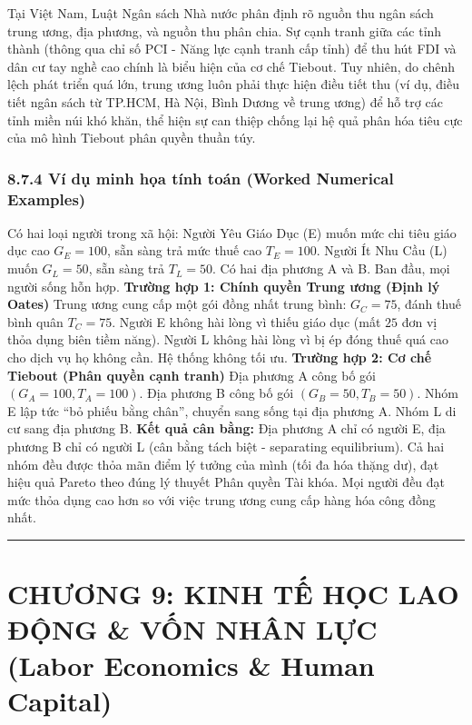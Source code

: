 \documentclass[
]{article}
\begin{document}
Tại Việt Nam, Luật Ngân sách Nhà nước phân định rõ nguồn thu ngân sách
trung ương, địa phương, và nguồn thu phân chia. Sự cạnh tranh giữa các
tỉnh thành (thông qua chỉ số PCI - Năng lực cạnh tranh cấp tỉnh) để thu
hút FDI và dân cư tay nghề cao chính là biểu hiện của cơ chế Tiebout.
Tuy nhiên, do chênh lệch phát triển quá lớn, trung ương luôn phải thực
hiện điều tiết thu (ví dụ, điều tiết ngân sách từ TP.HCM, Hà Nội, Bình
Dương về trung ương) để hỗ trợ các tỉnh miền núi khó khăn, thể hiện sự
can thiệp chống lại hệ quả phân hóa tiêu cực của mô hình Tiebout phân
quyền thuần túy.

\subsubsection{8.7.4 Ví dụ minh họa tính toán (Worked Numerical
Examples)}\label{vuxed-dux1ee5-minh-hux1ecda-tuxednh-touxe1n-worked-numerical-examples-31}

Có hai loại người trong xã hội: Người Yêu Giáo Dục (E) muốn mức chi tiêu
giáo dục cao \(G_E = 100\), sẵn sàng trả mức thuế cao \(T_E = 100\).
Người Ít Nhu Cầu (L) muốn \(G_L = 50\), sẵn sàng trả \(T_L = 50\). Có
hai địa phương A và B. Ban đầu, mọi người sống hỗn hợp. \textbf{Trường
hợp 1: Chính quyền Trung ương (Định lý Oates)} Trung ương cung cấp một
gói đồng nhất trung bình: \(G_C = 75\), đánh thuế bình quân
\(T_C = 75\). Người E không hài lòng vì thiếu giáo dục (mất \(25\) đơn
vị thỏa dụng biên tiềm năng). Người L không hài lòng vì bị ép đóng thuế
quá cao cho dịch vụ họ không cần. Hệ thống không tối ưu. \textbf{Trường
hợp 2: Cơ chế Tiebout (Phân quyền cạnh tranh)} Địa phương A công bố gói
\((G_A = 100, T_A = 100)\). Địa phương B công bố gói
\((G_B = 50, T_B = 50)\). Nhóm E lập tức ``bỏ phiếu bằng chân'', chuyển
sang sống tại địa phương A. Nhóm L di cư sang địa phương B. \textbf{Kết
quả cân bằng:} Địa phương A chỉ có người E, địa phương B chỉ có người L
(cân bằng tách biệt - separating equilibrium). Cả hai nhóm đều được thỏa
mãn điểm lý tưởng của mình (tối đa hóa thặng dư), đạt hiệu quả Pareto
theo đúng lý thuyết Phân quyền Tài khóa. Mọi người đều đạt mức thỏa dụng
cao hơn so với việc trung ương cung cấp hàng hóa công đồng nhất.

\begin{center}\rule{0.5\linewidth}{0.5pt}\end{center}

\section{CHƯƠNG 9: KINH TẾ HỌC LAO ĐỘNG \& VỐN NHÂN LỰC (Labor Economics
\& Human
Capital)}\label{chux1b0ux1a1ng-9-kinh-tux1ebf-hux1ecdc-lao-ux111ux1ed9ng-vux1ed1n-nhuxe2n-lux1ef1c-labor-economics-human-capital}
\end{document}
